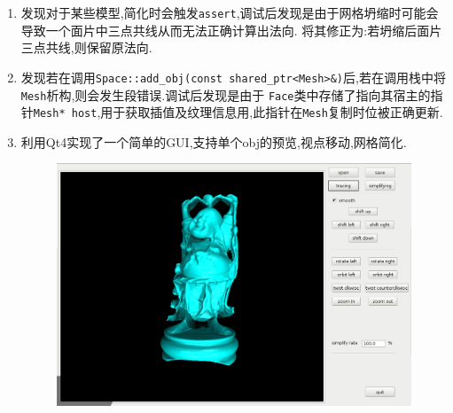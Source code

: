 \begin{enumerate}
\begin{figure}[H]
\end{figure}

\item 发现对于某些模型,简化时会触发\verb|assert|,调试后发现是由于网格坍缩时可能会导致一个面片中三点共线从而无法正确计算出法向.
  将其修正为:若坍缩后面片三点共线,则保留原法向.

  \item 发现若在调用\verb|Space::add_obj(const shared_ptr<Mesh>&)|后,若在调用栈中将\verb|Mesh|析构,则会发生段错误.调试后发现是由于
    \verb|Face|类中存储了指向其宿主的指针\verb|Mesh* host|,用于获取插值及纹理信息用,此指针在\verb|Mesh|复制时位被正确更新.


    \item 利用Qt4实现了一个简单的GUI,支持单个obj的预览,视点移动,网格简化.

\begin{figure}[H]
  \centering
  \includegraphics[scale=0.4]{img/gui.png}
  \caption*{\label{fig:gui}}
\end{figure}


\end{enumerate}
